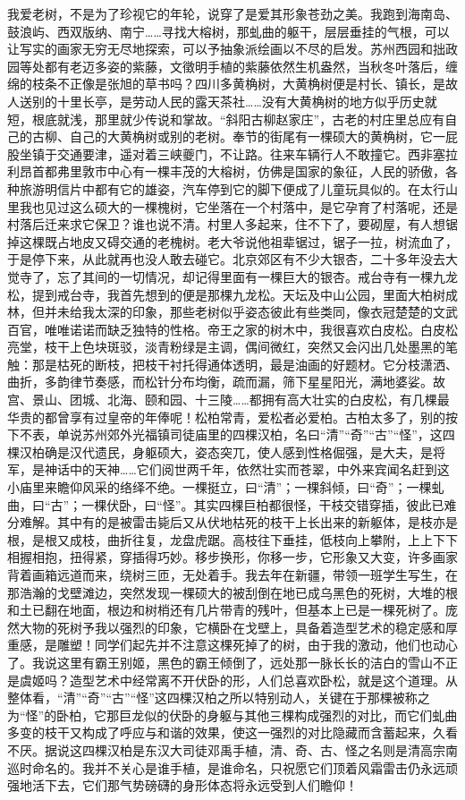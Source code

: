 \documentclass{article}
\begin{document}
我爱老树，不是为了珍视它的年轮，说穿了是爱其形象苍劲之美。我跑到海南岛、鼓浪屿、西双版纳、南宁……寻找大榕树，那虬曲的躯干，层层垂挂的气根，可以让写实的画家无穷无尽地探索，可以予抽象派绘画以不尽的启发。苏州西园和拙政园等处都有老迈多姿的紫藤，文徵明手植的紫藤依然生机盎然，当秋冬叶落后，缠绵的枝条不正像是张旭的草书吗？四川多黄桷树，大黄桷树便是村长、镇长，是故人送别的十里长亭，是劳动人民的露天茶社……没有大黄桷树的地方似乎历史就短，根底就浅，那里就少传说和掌故。“斜阳古柳赵家庄”，古老的村庄里总应有自己的古柳、自己的大黄桷树或别的老树。奉节的街尾有一棵硕大的黄桷树，它一屁股坐镇于交通要津，遥对着三峡夔门，不让路。往来车辆行人不敢撞它。西非塞拉利昂首都弗里敦市中心有一棵丰茂的大榕树，仿佛是国家的象征，人民的骄傲，各种旅游明信片中都有它的雄姿，汽车停到它的脚下便成了儿童玩具似的。在太行山里我也见过这么硕大的一棵槐树，它坐落在一个村落中，是它孕育了村落呢，还是村落后迁来求它保卫？谁也说不清。村里人多起来，住不下了，要砌屋，有人想锯掉这棵既占地皮又碍交通的老槐树。老大爷说他祖辈锯过，锯子一拉，树流血了，于是停下来，从此就再也没人敢去碰它。北京郊区有不少大银杏，二十多年没去大觉寺了，忘了其间的一切情况，却记得里面有一棵巨大的银杏。戒台寺有一棵九龙松，提到戒台寺，我首先想到的便是那棵九龙松。天坛及中山公园，里面大柏树成林，但并未给我太深的印象，那些老树似乎姿态彼此有些类同，像衣冠楚楚的文武百官，唯唯诺诺而缺乏独特的性格。帝王之家的树木中，我很喜欢白皮松。白皮松亮堂，枝干上色块斑驳，淡青粉绿是主调，偶间微红，突然又会闪出几处墨黑的笔触：那是枯死的断枝，把枝干衬托得通体透明，最是油画的好题材。它分枝潇洒、曲折，多韵律节奏感，而松针分布均衡，疏而漏，筛下星星阳光，满地婆娑。故宫、景山、团城、北海、颐和园、十三陵……都拥有高大壮实的白皮松，有几棵最华贵的都曾享有过皇帝的年俸呢！松柏常青，爱松者必爱柏。古柏太多了，别的按下不表，单说苏州郊外光福镇司徒庙里的四棵汉柏，名曰“清”“奇”“古”“怪”，这四棵汉柏确是汉代遗民，身躯硕大，姿态突兀，使人感到性格倔强，是大夫，是将军，是神话中的天神……它们阅世两千年，依然壮实而苍翠，中外来宾闻名赶到这小庙里来瞻仰风采的络绎不绝。一棵挺立，曰“清”；一棵斜倾，曰“奇”；一棵虬曲，曰“古”；一棵伏卧，曰“怪”。其实四棵巨柏都很怪，干枝交错穿插，彼此已难分难解。其中有的是被雷击毙后又从伏地枯死的枝干上长出来的新躯体，是枝亦是根，是根又成枝，曲折往复，龙盘虎踞。高枝往下垂挂，低枝向上攀附，上上下下相握相抱，扭得紧，穿插得巧妙。移步换形，你移一步，它形象又大变，许多画家背着画箱远道而来，绕树三匝，无处着手。我去年在新疆，带领一班学生写生，在那浩瀚的戈壁滩边，突然发现一棵硕大的被刮倒在地已成乌黑色的死树，大堆的根和土已翻在地面，根边和树梢还有几片带青的残叶，但基本上已是一棵死树了。庞然大物的死树予我以强烈的印象，它横卧在戈壁上，具备着造型艺术的稳定感和厚重感，是雕塑！同学们起先并不注意这棵死掉了的树，由于我的激动，他们也动心了。我说这里有霸王别姬，黑色的霸王倾倒了，远处那一脉长长的洁白的雪山不正是虞姬吗？造型艺术中经常离不开伏卧的形，人们总喜欢卧松，就是这个道理。从整体看，“清”“奇”“古”“怪”这四棵汉柏之所以特别动人，关键在于那棵被称之为“怪”的卧柏，它那巨龙似的伏卧的身躯与其他三棵构成强烈的对比，而它们虬曲多变的枝干又构成了呼应与和谐的效果，使这一强烈的对比隐藏而含蓄起来，久看不厌。据说这四棵汉柏是东汉大司徒邓禹手植，清、奇、古、怪之名则是清高宗南巡时命名的。我并不关心是谁手植，是谁命名，只祝愿它们顶着风霜雷击仍永远顽强地活下去，它们那气势磅礴的身形体态将永远受到人们瞻仰！
\end{document}
